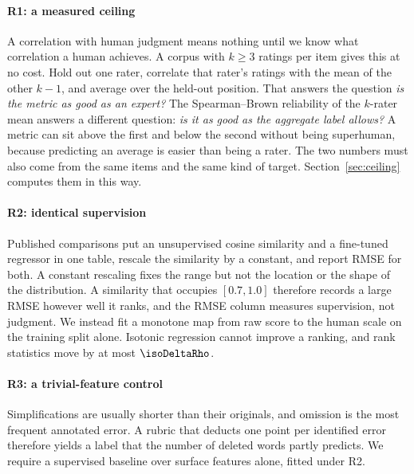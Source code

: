 \documentclass{BVP_JCLLT}
\newcommand{\rev}[1]{#1}
\newcommand{\rev}[1]{{\color{revcol}#1}}
\begin{document}
\rev{\paragraph{R1: a measured ceiling}
A correlation with human judgment means nothing until we know what correlation a
human achieves. A corpus with $k \geq 3$ ratings per item gives this at no cost.
Hold out one rater, correlate that rater's ratings with the mean of the other
$k-1$, and average over the held-out position. That answers the question
\emph{is the metric as good as an expert?} The Spearman--Brown reliability of
the $k$-rater mean answers a different question: \emph{is it as good as the
aggregate label allows?} A metric can sit above the first and below the second
without being superhuman, because predicting an average is easier than being a
rater. The two numbers must also come from the same items and the same kind of
target. Section~\ref{sec:ceiling} computes them in this way.

\paragraph{R2: identical supervision}
Published comparisons put an unsupervised cosine similarity and a fine-tuned
regressor in one table, rescale the similarity by a constant, and report RMSE
for both. A constant rescaling fixes the range but not the location or the shape
of the distribution. A similarity that occupies $[0.7,1.0]$ therefore records a
large RMSE however well it ranks, and the RMSE column measures supervision, not
judgment. We instead fit a monotone map from raw score to the human scale on the
training split alone. Isotonic regression cannot improve a ranking, and rank
statistics move by at most $\isoDeltaRho$.

\paragraph{R3: a trivial-feature control}
Simplifications are usually shorter than their originals, and omission is the
most frequent annotated error. A rubric that deducts one point per identified
error therefore yields a label that the number of deleted words partly predicts.
We require a supervised baseline over surface features alone, fitted under R2.

}
\end{document}
